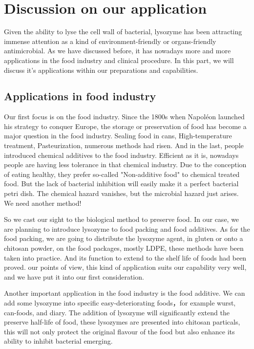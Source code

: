 \documentclass[a4paper,10pt]{article}
\begin{document}
    \section{Discussion on our application}
    Given the ability to lyse the cell wall of bacterial,
    lysozyme has been attracting immense attention as a kind of 
    environment-friendly or organs-friendly antimicrobial.
    As we have discussed before, it has nowadays more and more applications in the food industry and clinical procedure. In this part,  we will discuss 
    it's applications within our preparations and capabilities.
    \subsection{Applications in food industry}
    Our first focus is on the food industry. Since the 1800s when Napoléon launched his strategy to conquer Europe, the storage or preservation of food has become a major question in the food industry. Sealing food in cans, High-temperature treatment, Pasteurization, numerous methods had risen. And in the last, people introduced chemical additives to the food industry. Efficient as it is, nowadays people are having less tolerance in that chemical industry. Due to the conception of eating healthy, they prefer so-called "Non-additive food" to chemical treated food. But the lack of bacterial inhibition will easily make it a perfect bacterial petri dish. The chemical hazard vanishes, but the microbial hazard just arises. We need another method!
    
    So we cast our sight to the biological method to preserve food. In our case, we are planning to introduce lysozyme to food packing and food additives. As for the food packing, we are going to distribute the lysozyme agent, in gluten\citep{Conte2006} or onto a chitosan powder, on the food packages, mostly LDPE, these methods have been taken into practice\citep{Borzooeian2017}. And its function to extend to the shelf life of foods had been proved.\citep{Lian2012, Alhazmi2014} our points of view, this kind of application suits our capability very well, and we have put it into our first consideration.

    Another important application in the food industry is the food additive. We can add some lysozyme into specific easy-deteriorating foods，for example wurst, can-foods, and diary. The addition of lysozyme will significantly extend the preserve half-life of food, these lysozymes are presented into chitosan particals\citep{Wu2017}, this will not only protect the original flavour of the food but also enhance its ability to inhibit bacterial emerging.
\end{document}
